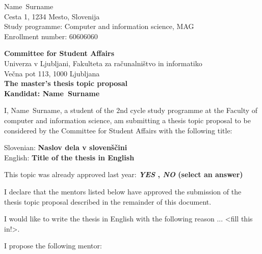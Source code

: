 \documentclass[a4paper, 12pt]{article}
\begin{document}
\newcommand{\ImeKandidata}{Name} %
\newcommand{\PriimekKandidata}{Surname} %
\newcommand{\VpisnaStevilka}{60606060 } %
\newcommand{\StudyProgramme}{Computer and information science, MAG} %
\newcommand{\NaslovBivalisca}{ Cesta 1, 1234 Mesto, Slovenija } %
\newcommand{\SLONaslov}{Naslov dela v slovenščini} %
\newcommand{\ENGNaslov}{Title of the thesis in English} %


\newcommand{\Kandidat}{\ImeKandidata~\PriimekKandidata}
\noindent
\Kandidat\\
\NaslovBivalisca \\
Study programme: \StudyProgramme \\
Enrollment number: \VpisnaStevilka
\bigskip

{\bf Committee for Student Affairs}\\
Univerza v Ljubljani, Fakulteta za računalništvo in informatiko\\
Večna pot 113, 1000 Ljubljana\\

{\Large\bf
{\centering
    The master’s thesis topic proposal \\%
\large Kandidat: \Kandidat \\[10mm]}}


I, \Kandidat, a student of the 2nd cycle study programme at the Faculty of computer and information science, am submitting a thesis topic proposal to be considered by the Committee for Student Affairs with the following title:

Slovenian: {\bf \SLONaslov}\\
English: {\bf \ENGNaslov}

This topic was already approved last year: {\bf \textit{YES} , \textit{NO} (select an answer) }
 

I declare that the mentors listed below have approved the submission of the thesis topic proposal described in the remainder of this document.

I would like to write the thesis in English with the following reason ... <fill this in!>.

I propose the following mentor:
\end{document}

